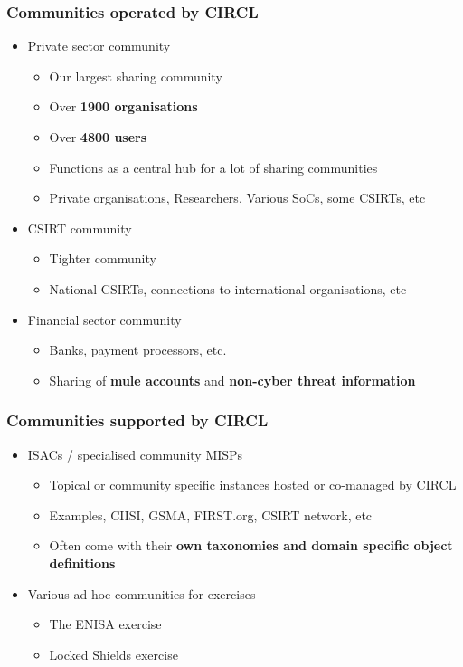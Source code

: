 \begin{frame}
	\frametitle{Communities operated by CIRCL}
	\begin{itemize}
		\item Private sector community
		\begin{itemize}
			\item Our largest sharing community
			\item Over {\bf 1900 organisations}
			\item Over {\bf 4800 users}
			\item Functions as a central hub for a lot of sharing communities
			\item Private organisations, Researchers, Various SoCs, some CSIRTs, etc
		\end{itemize}
		\item CSIRT community
		\begin{itemize}
			\item Tighter community
			\item National CSIRTs, connections to international organisations, etc
		\end{itemize}
		\item Financial sector community
		\begin{itemize}
			\item Banks, payment processors, etc.
			\item Sharing of {\bf mule accounts} and {\bf non-cyber threat information}
		\end{itemize}
	\end{itemize}
\end{frame}

\begin{frame}
	\frametitle{Communities supported by CIRCL}
	\begin{itemize}
        \item ISACs / specialised community MISPs
        \begin{itemize}
            \item Topical or community specific instances hosted or co-managed by CIRCL
            \item Examples, CIISI, GSMA, FIRST.org, CSIRT network, etc
            \item Often come with their {\bf own taxonomies and domain specific object definitions}
        \end{itemize}
		\item Various ad-hoc communities for exercises
		\begin{itemize}
			\item The ENISA exercise
			\item Locked Shields exercise
		\end{itemize}
	\end{itemize}
\end{frame}

